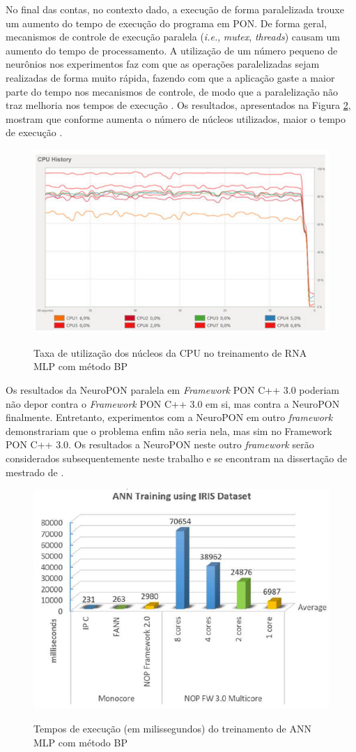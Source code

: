 No final das contas, no contexto dado, a execução de forma paralelizada trouxe
um aumento do tempo de execução do programa em PON. De forma geral, mecanismos
de controle de execução paralela (\textit{i.e.}, \textit{mutex},
\textit{threads}) causam um aumento do tempo de processamento. A utilização de
um número pequeno de neurônios nos experimentos faz com que as operações
paralelizadas sejam realizadas de forma muito rápida, fazendo com que a
aplicação gaste a maior parte do tempo nos mecanismos de controle, de modo que a
paralelização não traz melhoria nos tempos de execução \cite{schutz_2018}. Os
resultados, apresentados na Figura \ref{fig:pon_multi}, mostram que conforme
aumenta o número de núcleos utilizados, maior o tempo de execução
\cite{schutz_2018}.

\begin{figure}[!htb]
  \centering
  \caption{Taxa de utilização dos núcleos da CPU no treinamento de RNA MLP com método BP}
  \includegraphics[width=.65\textwidth]{../figures/core_usage_cpp3.png}
  \label{fig:core_usage_cpp3}
\end{figure}

Os resultados da NeuroPON paralela em \textit{Framework} PON C++ 3.0 poderiam
não depor contra o \textit{Framework} PON C++ 3.0 em si, mas contra a NeuroPON
finalmente. Entretanto, experimentos com a NeuroPON em outro \textit{framework}
demonstrariam que o problema enfim não seria nela, mas sim no Framework PON C++
3.0. Os resultados a NeuroPON neste outro \textit{framework} serão considerados
subsequentemente neste trabalho e se encontram na dissertação de mestrado de
.

\begin{figure}[!htb]
  \centering
  \caption{Tempos de execução (em milissegundos) do treinamento de ANN MLP com método BP}
  \includegraphics[width=.55\textwidth]{../figures/pon_multi_fix.png}
  \label{fig:pon_multi}
\end{figure}

